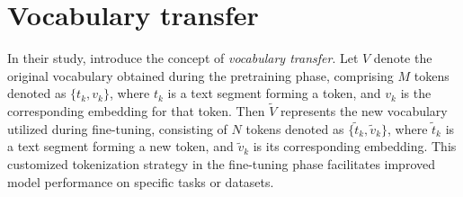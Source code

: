 \documentclass[11pt]{article}
\begin{document}



\section{Vocabulary transfer}

In their study, \citet{mosin2023fine} introduce the concept of {\em vocabulary transfer}. Let $V$ denote the original vocabulary obtained during the pretraining phase, comprising $M$ tokens denoted as $\{t_k, v_k\}$, where $t_k$ is a text segment forming a token, and $v_k$ is the corresponding embedding for that token. Then $\widetilde{V}$ represents the new vocabulary utilized during fine-tuning, consisting of $N$ tokens denoted as $\{\widetilde{t}_k, \widetilde{v}_k\}$, where $\widetilde{t}_k$ is a text segment forming a new token, and $\widetilde{v}_k$ is its corresponding embedding. This customized tokenization strategy in the fine-tuning phase facilitates improved model performance on specific tasks or datasets.
\end{document}
